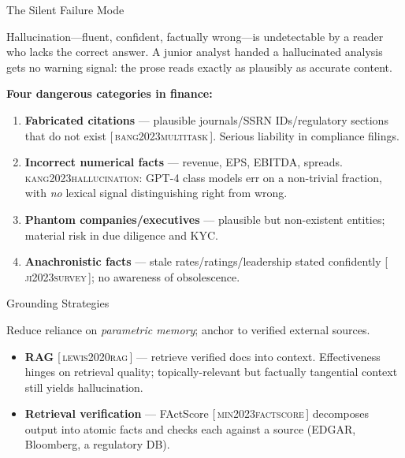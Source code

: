 \documentclass[9pt,t]{beamer}
\newcommand{\citesrc}[1]{\textsc{\small #1}}
\providecommand{\citet}[1]{\citesrc{#1}}
\providecommand{\citep}[1]{{\footnotesize[\,\citesrc{#1}\,]}}
\begin{document}
\begin{frame}{The Silent Failure Mode}
\begin{bigpicture}
Hallucination---fluent, confident, factually wrong---is undetectable by a reader
who lacks the correct answer. A junior analyst handed a hallucinated analysis
gets no warning signal: the prose reads exactly as plausibly as accurate
content.
\end{bigpicture}

\medskip
\textbf{Four dangerous categories in finance:}
\begin{enumerate}
  \item \textbf{Fabricated citations} --- plausible journals/SSRN IDs/regulatory
        sections that do not exist \citep{bang2023multitask}. Serious liability
        in compliance filings.
  \item \textbf{Incorrect numerical facts} --- revenue, EPS, EBITDA, spreads.
        \citet{kang2023hallucination}: GPT-4 class models err on a non-trivial
        fraction, with \emph{no} lexical signal distinguishing right from wrong.
  \item \textbf{Phantom companies/executives} --- plausible but non-existent
        entities; material risk in due diligence and KYC.
  \item \textbf{Anachronistic facts} --- stale rates/ratings/leadership stated
        confidently \citep{ji2023survey}; no awareness of obsolescence.
\end{enumerate}
\end{frame}

\begin{frame}{Grounding Strategies}
\begin{underhood}
\footnotesize
Reduce reliance on \emph{parametric memory}; anchor to verified external sources.
\begin{itemize}\itemsep2pt
  \item \textbf{RAG} \citep{lewis2020rag} --- retrieve verified docs into context.
        Effectiveness hinges on retrieval quality; topically-relevant but
        factually tangential context still yields hallucination.
  \item \textbf{Retrieval verification} --- FActScore \citep{min2023factscore}
        decomposes output into atomic facts and checks each against a source
        (EDGAR, Bloomberg, a regulatory DB).
\end{itemize}
\end{underhood}
\end{frame}
\end{document}

